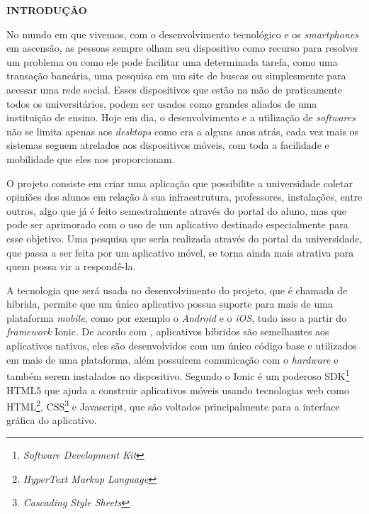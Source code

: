 \vspace{1.2em}
\textbf{\large INTRODUÇÃO}

\vspace{2.9em}


	\par No mundo em que vivemos, com o desenvolvimento tecnológico e os \textit{smartphones} em ascensão, as pessoas sempre olham seu dispositivo como recurso para resolver um problema ou como ele pode facilitar uma determinada tarefa, como uma transação bancária, uma pesquisa em um site de buscas ou simplesmente para acessar uma rede social. Esses dispositivos que estão na mão de praticamente todos os universitários, podem ser usados como grandes aliados de uma instituição de ensino. Hoje em dia, o desenvolvimento e a utilização de \textit{softwares} não se limita apenas aos \textit{desktops} como era a alguns anos atrás, cada vez mais os sistemas seguem atrelados aos dispositivos móveis, com toda a facilidade e mobilidade que eles nos proporcionam.
	
	\par O projeto consiste em criar uma aplicação que possibilite a universidade coletar opiniões dos alunos em relação à sua infraestrutura, professores, instalações, entre outros, algo que já é feito semestralmente através do portal do aluno, mas que pode ser aprimorado com o uso de um aplicativo destinado especialmente para esse objetivo. Uma pesquisa que seria realizada através do portal da universidade, que passa a ser feita por um aplicativo móvel, se torna ainda mais atrativa para quem possa vir a respondê-la. 

	\par A tecnologia que será usada no desenvolvimento do projeto, que é chamada de híbrida, permite que um único aplicativo possua suporte para mais de uma plataforma \textit{mobile}, como por exemplo o \textit{Android} e o \textit{iOS}, tudo isso a partir do \textit{framework} Ionic. De acordo com , aplicativos híbridos são semelhantes aos aplicativos nativos, eles são desenvolvidos com um único código base e utilizados em mais de uma plataforma, além possuírem comunicação com o \textit{hardware} e também serem instalados no dispositivo. Segundo  o Ionic é um poderoso SDK\footnote{\textit{Software Development Kit}} HTML5 que ajuda a construir aplicativos móveis usando tecnologias web como HTML\footnote{\textit{HyperText Markup Language}}, CSS\footnote{\textit{Cascading Style Sheets}} e Javascript, que são voltados principalmente para a interface gráfica do aplicativo.

